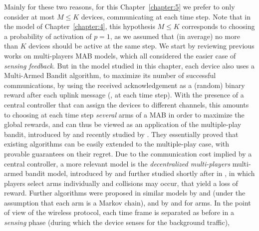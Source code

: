 Mainly for these two reasons, for this Chapter~\ref{chapter:5} we prefer to only consider at most $M \leq K$ devices, communicating at each time step.
Note that in the model of Chapter~\ref{chapter:4}, this hypothesis $M \leq K$ corresponds to choosing a probability of activation of $p=1$, as we assumed that (in average) no more than $K$ devices should be active at the same step.
%
We start by reviewing previous works on multi-players MAB models, which all considered the easier case of \emph{sensing feedback}.
But in the model studied in this chapter, each device also uses a Multi-Armed Bandit algorithm, to maximize its number of successful communications, by using the received acknowledgement \Ack{} as a (random) binary reward after each uplink message (\ie, at each time step).
%
With the presence of a central controller that can assign the devices to different channels, this amounts to choosing at each time step \emph{several} arms of a MAB in order to maximize the global rewards, and can thus be viewed as an application of the multiple-play bandit, introduced by \cite{Anantharam87a} and recently studied by \cite{Komiyama15}.
They essentially proved that existing algorithms can be easily extended to the multiple-play case, with provable guarantees on their regret.
%
%
Due to the communication cost implied by a central controller, a more relevant model is the
\emph{decentralized multi-players} multi-armed bandit model, introduced by \cite{Zhao10} and further studied shortly after in \cite{Anandkumar10,Anandkumar11}, in which players select arms individually and collisions may occur, that yield a loss of reward.
Further algorithms were proposed in similar models by \cite{Tekin12IEEE} and \cite{Kalathil12} (under the assumption that each arm is a Markov chain),
and by \cite{Avner15,Avner16} and \cite{Rosenski16} for \iid{} arms.
%
In the point of view of the wireless protocol, each time frame is separated as before in a \emph{sensing} phase (during which the device senses for the background traffic),
